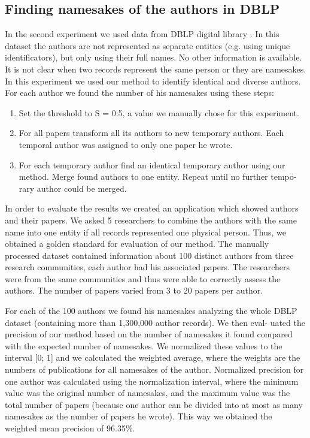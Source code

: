 \documentclass{llncs}
\begin{document}
\subsection{Finding namesakes of the authors in DBLP}
In the second experiment we used data from DBLP digital library \cite{10}. In this
dataset the authors are not represented as separate entities (e.g. using unique
identificators), but only using their full names. No other information is available.
It is not clear when two records represent the same person or they are namesakes.
In this experiment we used our method to identify identical and diverse authors.
For each author we found the number of his namesakes using these steps:
\begin{enumerate}
\item{Set the threshold to S = 0:5, a value we manually chose for this experiment.}
\item{For all papers transform all its authors to new temporary authors. Each
temporal author was assigned to only one paper he wrote.}
\item{For each temporary author find an identical temporary author using our
method. Merge found authors to one entity. Repeat until no further tempo-
rary author could be merged.}
\end{enumerate}
In order to evaluate the results we created an application which showed
authors and their papers. We asked 5 researchers to combine the authors with
the same name into one entity if all records represented one physical person.
Thus, we obtained a golden standard for evaluation of our method. The manually
processed dataset contained information about 100 distinct authors from three
research communities, each author had his associated papers. The researchers
were from the same communities and thus were able to correctly assess the
authors. The number of papers varied from 3 to 20 papers per author.

For each of the 100 authors we found his namesakes analyzing the whole
DBLP dataset (containing more than 1,300,000 author records). We then eval-
uated the precision of our method based on the number of namesakes it found
compared with the expected number of namesakes. We normalized these values
to the interval [0; 1] and we calculated the weighted average, where the weights
are the numbers of publications for all namesakes of the author. Normalized
precision for one author was calculated using the normalization interval, where
the minimum value was the original number of namesakes, and the maximum
value was the total number of papers (because one author can be divided into
at most as many namesakes as the number of papers he wrote). This way we
obtained the weighted mean precision of 96.35\%.
\end{document}
